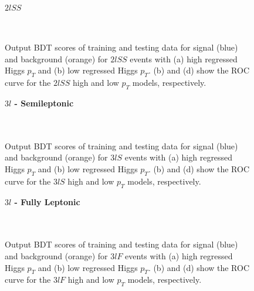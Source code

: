 \begin{figure}[H]
  \centering
  \textbf{$2lSS$}\\
  \\
  \\ 
  \caption{Output BDT scores of training and testing data for signal (blue) and background (orange) for $2lSS$ events with (a) high regressed Higgs $p_T$ and (b) low regressed Higgs $p_T$. (b) and (d) show the ROC curve for the $2lSS$ high and low $p_T$ models, respectively.}
  \label{fig:sigBkgScore2lSS}
\end{figure}

\begin{figure}[H]
  \centering
  \textbf{$3l$ - Semileptonic}\\
  \\                                   
  \\                                    
  \caption{Output BDT scores of training and testing data for signal (blue) and background (orange) for $3lS$ events with (a) high regressed Higgs $p_T$ and (b) low regressed Higgs $p_T$. (b) and (d) show the ROC curve for the $3lS$ high and low $p_T$ models, respectively.}
  \label{fig:sigBkgScore3lS}                                                                                                
\end{figure}

\begin{figure}[H]
  \centering
  \textbf{$3l$ - Fully Leptonic}\\
  \\                                  
  \\                                    
  \caption{Output BDT scores of training and testing data for signal (blue) and background (orange) for $3lF$ events with (a) high regressed Higgs $p_T$ and (b) low regressed Higgs $p_T$. (b) and (d) show the ROC curve for the $3lF$ high and low $p_T$ models, respectively.}
  \label{fig:sigBkgScore3lF}                                                                                                
\end{figure}

